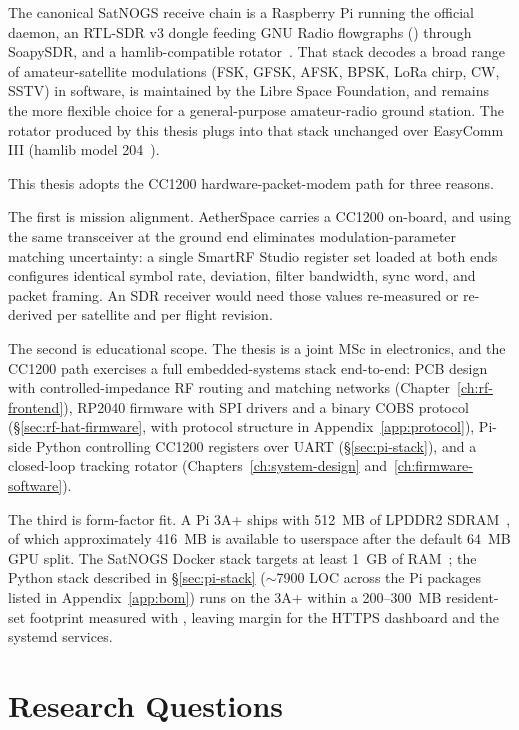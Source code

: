 The canonical SatNOGS receive chain is a Raspberry Pi running the official  daemon, an RTL-SDR v3 dongle feeding GNU Radio flowgraphs () through SoapySDR, and a hamlib-compatible rotator~\cite{satnogs-main, hamlib}. That stack decodes a broad range of amateur-satellite modulations (FSK, GFSK, AFSK, BPSK, LoRa chirp, CW, SSTV) in software, is maintained by the Libre Space Foundation, and remains the more flexible choice for a general-purpose amateur-radio ground station. The rotator produced by this thesis plugs into that stack unchanged over EasyComm III (hamlib model 204~\cite{jackson1990easycomm}).

This thesis adopts the CC1200 hardware-packet-modem path for three reasons.

The first is mission alignment. AetherSpace carries a CC1200 on-board, and using the same transceiver at the ground end eliminates modulation-parameter matching uncertainty: a single SmartRF Studio register set loaded at both ends configures identical symbol rate, deviation, filter bandwidth, sync word, and packet framing. An SDR receiver would need those values re-measured or re-derived per satellite and per flight revision.

The second is educational scope. The thesis is a joint MSc in electronics, and the CC1200 path exercises a full embedded-systems stack end-to-end: PCB design with controlled-impedance RF routing and matching networks (Chapter~\ref{ch:rf-frontend}), RP2040 firmware with SPI drivers and a binary COBS protocol (\S\ref{sec:rf-hat-firmware}, with protocol structure in Appendix~\ref{app:protocol}), Pi-side Python controlling CC1200 registers over UART (\S\ref{sec:pi-stack}), and a closed-loop tracking rotator (Chapters~\ref{ch:system-design} and~\ref{ch:firmware-software}).

The third is form-factor fit. A Pi 3A+ ships with 512~MB of LPDDR2 SDRAM~\cite{rpi3aplus}, of which approximately 416~MB is available to userspace after the default 64~MB GPU split. The SatNOGS Docker stack targets at least 1~GB of RAM~\cite{satnogs-main}; the Python stack described in \S\ref{sec:pi-stack} ($\sim$7900 LOC across the Pi packages listed in Appendix~\ref{app:bom}) runs on the 3A+ within a 200--300~MB resident-set footprint measured with , leaving margin for the HTTPS dashboard and the systemd services.

\pagebreak
\section{Research Questions}


